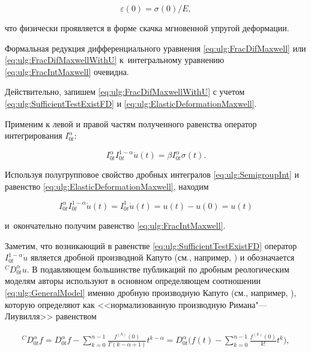 \begin{equation}\label{eq:ulg:ElasticDeformationMaxwell}

\varepsilon(0)={\sigma(0)}/{E},

\end{equation}

что физически проявляется в форме скачка мгновенной упругой деформации. 

Формальная редукция дифференциального уравнения \eqref{eq:ulg:FracDifMaxwell} или \eqref{eq:ulg:FracDifMaxwellWithU} к~интегральному уравнению \eqref{eq:ulg:FracIntMaxwell} очевидна.



Действительно, запишем \eqref{eq:ulg:FracDifMaxwellWithU} с учетом \eqref{eq:ulg:SufficientTestExistFD} и \eqref{eq:ulg:ElasticDeformationMaxwell}. 

Применим к левой и правой частям полученного равенства оператор интегрирования $I^{\alpha}_{0t}$:

\begin{equation*}%

I^{\alpha}_{0t}I^{1-\alpha}_{0t}\dot{u}(t)=\beta I^{\alpha}_{0t}\sigma(t).

\end{equation*}

Используя полугрупповое свойство  дробных	интегралов \eqref{eq:ulg:SemigroupInt} и равенство \eqref{eq:ulg:ElasticDeformationMaxwell}, находим

$$

I^{\alpha}_{0t}I^{1-\alpha}_{0t}\dot{u}(t)=I^{1}_{0t}\dot{u}(t)=u(t)-u(0)=u(t)

$$

и~окончательно получим равенство \eqref{eq:ulg:FracIntMaxwell}.



Заметим, что возникающий в равенстве \eqref{eq:ulg:SufficientTestExistFD} оператор $I^{1-\alpha}_{0t}\dot{u}$ является дробной производной Капуто (см., например, \cite{ulg:bib:NahushevFracCalculus,ulg:bib:K-S-T,ulg:bib:Mainardi2010}) и обозначается $^{C}D^{\alpha}_{0t}u$. В подавляющем большинстве публикаций по дробным реологическим моделям авторы используют в основном определяющем соотношении \eqref{eq:ulg:GeneralModel} именно дробную производную Капуто (см., например, \cite{ulg:bib:CaputoMainardi_LinearModels,ulg:bib:CaputoMainardi_NewDissipation}), которую определяют как <<нормализованную производную Римана"---Лиувилля>> равенством

\begin{gather}\label{eq:ulg:CaputoFracDeriv}

^{C}D^{\alpha}_{0t}f=D^{\alpha}_{0t}f-\sum^{n-1}_{k=0}\frac{f^{(k)}(0)}{\Gamma(k-\alpha+1)}t^{k-\alpha}=

D^{\alpha}_{0t}\biggl(f(t)-\sum^{n-1}_{k=0}\frac{f^{(k)}(0)}{k!}t^{k}\biggr),

\end{gather}

